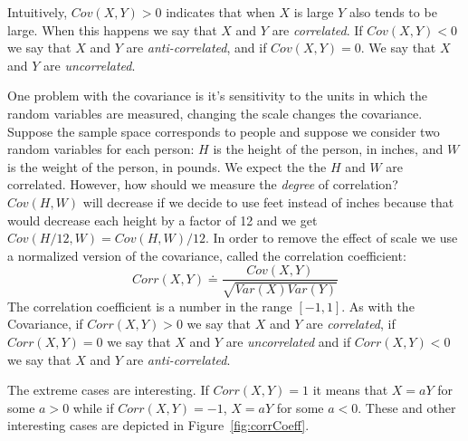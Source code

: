 Intuitively, $Cov(X,Y)>0$ indicates that when $X$ is large $Y$ also
tends to be large. When this happens we say that $X$ and $Y$ are {\em
  correlated}. If $Cov(X,Y)<0$ we say that $X$ and $Y$ are {\em
  anti-correlated}, and if $Cov(X,Y)=0$. We say that $X$ and $Y$ are
{\em uncorrelated}. 

One problem with the covariance is it's sensitivity to the units in
which the random variables are measured, changing the scale changes
the covariance. Suppose the sample space corresponds to people and
suppose we consider two random variables for each person: $H$ is the
height of the person, in inches, and $W$ is the weight of the person,
in pounds.  We expect the the $H$ and $W$ are correlated. However, how
should we measure the {\em degree} of correlation? $Cov(H,W)$ will
decrease if we decide to use feet instead of inches because that would 
decrease each height by a factor of 12 and we get
$Cov(H/12,W)=Cov(H,W)/12$. In order to remove the effect of scale we
use a normalized version of the covariance, called the correlation
coefficient:
\[
Corr(X,Y) \doteq \frac{Cov(X,Y)}{\sqrt{Var(X)Var(Y)}}
\]
The correlation coefficient is a number in the range $[-1,1]$. As with
the Covariance, if $Corr(X,Y)>0$ we say that $X$ and $Y$ are {\em
  correlated}, if $Corr(X,Y)=0$ we say that $X$ and $Y$ are {\em
  uncorrelated} and if $Corr(X,Y)<0$ we say that $X$ and $Y$ are {\em
  anti-correlated}.

The extreme cases are interesting. If $Corr(X,Y)=1$ it means that
$X=aY$ for some $a>0$ while if $Corr(X,Y)=-1$, $X=aY$ for some
$a<0$. These and other interesting cases are depicted in Figure~\ref{fig:corrCoeff}.

